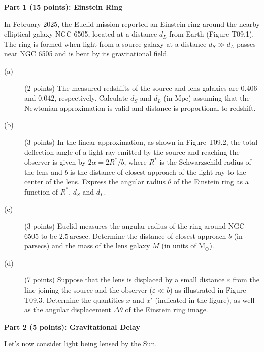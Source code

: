\medskip\noindent\textbf{Part 1 (15 points): Einstein Ring}

In February 2025, the Euclid mission reported an Einstein ring around the
nearby elliptical galaxy NGC 6505, located at a distance $d_L$ from Earth
(Figure T09.1). The ring is formed when light from a source galaxy at a
distance $d_S \gg d_L$ passes near NGC 6505 and is bent by its gravitational
field.


\begin{description}
\item[(a)] (2 points) The measured redshifts of the source and lens galaxies
  are $0.406$ and $0.042$, respectively. Calculate $d_S$ and $d_L$ (in
  $\mathrm{Mpc}$) assuming that the Newtonian approximation is valid and
  distance is proportional to redshift.
\item[(b)] (3 points) In the linear approximation, as shown in Figure T09.2,
  the total deflection angle of a light ray emitted by the source and reaching
  the observer is given by $2\alpha = 2R^*/b$, where $R^*$ is the
  Schwarzschild radius of the lens and $b$ is the distance of closest approach
  of the light ray to the center of the lens. Express the angular radius
  $\theta$ of the Einstein ring as a function of $R^*$, $d_S$ and $d_L$.


\item[(c)] (3 points) Euclid measures the angular radius of the ring around
  NGC 6505 to be $2.5\,\mathrm{arcsec}$. Determine the distance of closest
  approach $b$ (in $\mathrm{parsecs}$) and the mass of the lens galaxy $M$ (in
  units of $\mathrm{M}_\odot$).
\item[(d)] (7 points) Suppose that the lens is displaced by a small distance
  $\varepsilon$ from the line joining the source and the observer
  ($\varepsilon \ll b$) as illustrated in Figure T09.3. Determine the
  quantities $x$ and $x'$ (indicated in the figure), as well as the angular
  displacement $\Delta\theta$ of the Einstein ring image.
\end{description}

\medskip\noindent\textbf{Part 2 (5 points): Gravitational Delay}

Let's now consider light being lensed by the Sun.

